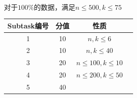 \documentclass[UTF8]{ctexart}
\begin{document}
\paragraph{}对于$100\%$的数据，满足$n\le 500,k\le 75$
\begin{center}
	\begin{tabular}{|c|c|c|c|}
		\hline
		Subtask编号&分值&性质\\
		\hline
		1&10&$n,k\le 6$\\
		\hline
		2&10&$n,k\le 40$\\
		\hline
		3&20&$n\le 100, k\le 10$\\
		\hline
		4&20&$n\le 200, k\le 50$\\
		\hline
		5&40&\\
		\hline
	\end{tabular}	
\end{center}
\end{document}
